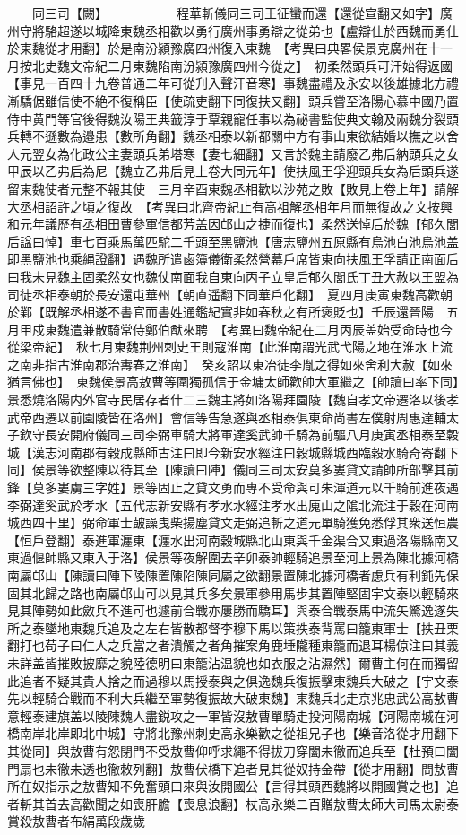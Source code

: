 　　同三司【闕】　　　　　　程華斬儀同三司王征蠻而還【還從宣翻又如字】廣州守將駱超遂以城降東魏丞相歡以勇行廣州事勇辯之從弟也【盧辯仕於西魏而勇仕於東魏從才用翻】於是南汾潁豫廣四州復入東魏　【考異曰典畧侯景克廣州在十一月按北史魏文帝紀二月東魏陷南汾潁豫廣四州今從之】　初柔然頭兵可汗始得返國【事見一百四十九卷普通二年可從刋入聲汗音寒】事魏盡禮及永安以後雄據北方禮漸驕倨雖信使不絶不復稱臣【使疏吏翻下同復扶又翻】頭兵嘗至洛陽心慕中國乃置侍中黄門等官後得魏汝陽王典籖淳于覃親寵任事以為祕書監使典文翰及兩魏分裂頭兵轉不遜數為邉患【數所角翻】魏丞相泰以新都關中方有事山東欲結婚以撫之以舍人元翌女為化政公主妻頭兵弟塔寒【妻七細翻】又言於魏主請廢乙弗后納頭兵之女甲辰以乙弗后為尼【魏立乙弗后見上卷大同元年】使扶風王孚迎頭兵女為后頭兵遂留東魏使者元整不報其使　三月辛酉東魏丞相歡以沙苑之敗【敗見上卷上年】請解大丞相詔許之頃之復故　【考異曰北齊帝紀止有高祖解丞相年月而無復故之文按興和元年議歷有丞相田曹參軍信都芳盖因邙山之捷而復也】柔然送悼后於魏【郁久閭后諡曰悼】車七百乘馬萬匹駝二千頭至黑鹽池【唐志鹽州五原縣有烏池白池烏池盖即黑鹽池也乘䋲證翻】遇魏所遣鹵簿儀衛柔然營幕戶席皆東向扶風王孚請正南面后曰我未見魏主固柔然女也魏仗南面我自東向丙子立皇后郁久閭氏丁丑大赦以王盟為司徒丞相泰朝於長安還屯華州【朝直遥翻下同華戶化翻】　夏四月庚寅東魏高歡朝於鄴【既解丞相遂不書官而書姓通鑑紀實非如春秋之有所褒貶也】壬辰還晉陽　五月甲戍東魏遣兼散騎常侍鄭伯猷來聘　【考異曰魏帝紀在二月丙辰盖始受命時也今從梁帝紀】　秋七月東魏荆州刺史王則寇淮南【此淮南謂光武弋陽之地在淮水上流之南非指古淮南郡治夀春之淮南】　癸亥詔以東冶徒李胤之得如來舍利大赦【如來猶言佛也】　東魏侯景高敖曹等圍獨孤信于金墉太師歡帥大軍繼之【帥讀曰率下同】景悉燒洛陽内外官寺民居存者什二三魏主將如洛陽拜園陵【魏自孝文帝遷洛以後孝武帝西遷以前園陵皆在洛州】會信等告急遂與丞相泰俱東命尚書左僕射周惠達輔太子欽守長安開府儀同三司李弼車騎大將軍達奚武帥千騎為前驅八月庚寅丞相泰至糓城【漢志河南郡有穀成縣師古注曰即今新安水經注曰穀城縣城西臨穀水騎奇寄翻下同】侯景等欲整陳以待其至【陳讀曰陣】儀同三司太安莫多婁貸文請帥所部擊其前鋒【莫多婁虜三字姓】景等固止之貸文勇而專不受命與可朱渾道元以千騎前進夜遇李弼達奚武於孝水【五代志新安縣有孝水水經注孝水出廆山之隂北流注于穀在河南城西四十里】弼命軍士皷譟曳柴揚塵貸文走弼追斬之道元單騎獲免悉俘其衆送恒農【恒戶登翻】泰進軍瀍東【瀍水出河南穀城縣北山東與千金渠合又東過洛陽縣南又東過偃師縣又東入于洛】侯景等夜解圍去辛卯泰帥輕騎追景至河上景為陳北據河橋南屬邙山【陳讀曰陣下陵陳置陳陷陳同屬之欲翻景置陳北據河橋者慮兵有利鈍先保固其北歸之路也南屬邙山可以見其兵多矣景軍參用馬步其置陣堅固宇文泰以輕騎來見其陣勢如此斂兵不進可也遽前合戰亦屢勝而驕耳】與泰合戰泰馬中流矢驚逸遂失所之泰墜地東魏兵追及之左右皆散都督李穆下馬以策抶泰背罵曰籠東軍士【抶丑栗翻打也荀子曰仁人之兵當之者潰觸之者角摧案角鹿埵隴種東籠而退耳楊倞注曰其義未詳盖皆摧敗披靡之貌陸德明曰東籠沾温貌也如衣服之沾濕然】爾曹主何在而獨留此追者不疑其貴人捨之而過穆以馬授泰與之俱逸魏兵復振擊東魏兵大破之【宇文泰先以輕騎合戰而不利大兵繼至軍勢復振故大破東魏】東魏兵北走京兆忠武公高敖曹意輕泰建旗盖以陵陳魏人盡鋭攻之一軍皆沒敖曹單騎走投河陽南城【河陽南城在河橋南岸北岸即北中城】守將北豫州刺史高永樂歡之從祖兄子也【樂音洛從才用翻下其從同】與敖曹有怨閉門不受敖曹仰呼求繩不得拔刀穿闔未徹而追兵至【杜預曰闔門扇也未徹未透也徹敕列翻】敖曹伏橋下追者見其從奴持金帶【從才用翻】問敖曹所在奴指示之敖曹知不免奮頭曰來與汝開國公【言得其頭西魏將以開國賞之也】追者斬其首去高歡聞之如喪肝膽【喪息浪翻】杖高永樂二百贈敖曹太師大司馬太尉泰賞殺敖曹者布絹萬段歲歲